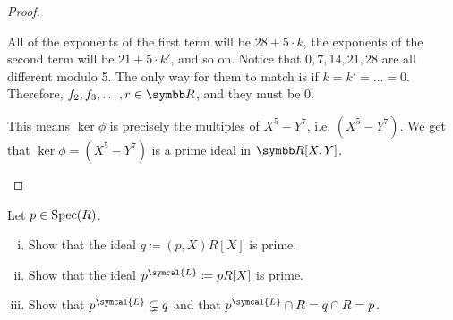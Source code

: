 \begin{proof}
\begin{enumerate}[(i)]
    All of the exponents of the first term will be \(28 + 5 \cdot k\), the exponents of the second term will be \(21 + 5 \cdot k'\), and so on. Notice that \(0, 7, 14, 21, 28\) are all different modulo 5. The only way for them to match is if \(k = k' = \dots = 0\). Therefore, \(f_2, f_3, \dots, r \in \reals\), and they must be \(0\). 
    
    This means \(\ker \phi\) is precisely the multiples of \(X^5 - Y^7\), i.e. \((X^5 - Y^7)\). We get that \(\ker \phi = (X^5 - Y^7)\) is a prime ideal in \(\reals[X, Y]\).
\end{enumerate}
\end{proof}

\begin{problem}
Let \(p \in \operatorname{Spec}(R)\).
\begin{enumerate}[(i)]
    \item Show that the ideal \(q \coloneqq (p, X) R[X]\) is prime.
    \item Show that the ideal \(p^{\symcal{L}} \coloneqq p R[X]\) is prime.
    \item Show that \(p^{\symcal{L}} \subsetneq q\) and that \(p^{\symcal{L}} \cap R = q \cap R = p\).
\end{enumerate}
\end{problem}
